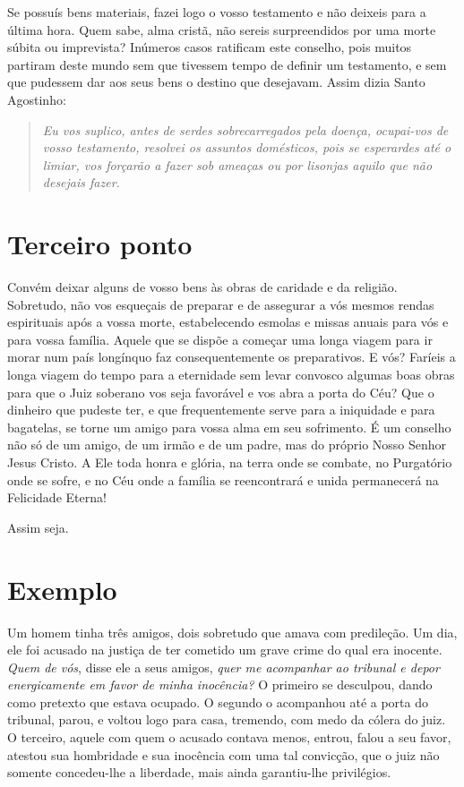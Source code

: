 Se possuís bens materiais, fazei logo o vosso testamento e não deixeis para a última hora. Quem sabe, alma cristã, não sereis surpreendidos por uma morte súbita ou imprevista? Inúmeros casos ratificam este conselho, pois muitos partiram deste mundo sem que tivessem tempo de definir um testamento, e sem que pudessem dar aos seus bens o destino que desejavam. Assim dizia Santo Agostinho:

\begin{quote}
\textit{\textit{Eu vos suplico, antes de serdes sobrecarregados pela doença, ocupai-vos de vosso testamento, resolvei os assuntos domésticos, pois se esperardes até o limiar, vos forçarão a fazer sob ameaças ou por lisonjas aquilo que não desejais fazer.}}
\end{quote}

\section*{Terceiro ponto}

Convém deixar alguns de vosso bens às obras de caridade e da religião. Sobretudo, não vos esqueçais de preparar e de assegurar a vós mesmos rendas espirituais após a vossa morte, estabelecendo esmolas e missas anuais para vós e para vossa família. Aquele que se dispõe a começar uma longa viagem para ir morar num país longínquo faz consequentemente os preparativos. E vós? Faríeis a longa viagem do tempo para a eternidade sem levar convosco algumas boas obras para que o Juiz soberano vos seja favorável e vos abra a porta do Céu? Que o dinheiro que pudeste ter, e que frequentemente serve para a iniquidade e para bagatelas, se torne um amigo para vossa alma em seu sofrimento. É um conselho não só de um amigo, de um irmão e de um padre, mas do próprio Nosso Senhor Jesus Cristo. A Ele toda honra e glória, na terra onde se combate, no Purgatório onde se sofre, e no Céu onde a família se reencontrará e unida permanecerá na Felicidade Eterna!

Assim seja.

\section*{Exemplo }

Um homem tinha três amigos, dois sobretudo que amava com predileção. Um dia, ele foi acusado na justiça de ter cometido um grave crime do qual era inocente. \textit{Quem de vós}, disse ele a seus amigos, \textit{quer me acompanhar ao tribunal e depor energicamente em favor de minha inocência?} O primeiro se desculpou, dando como pretexto que estava ocupado. O segundo o acompanhou até a porta do tribunal, parou, e voltou logo para casa, tremendo, com medo da cólera do juiz. O terceiro, aquele com quem o acusado contava menos, entrou, falou a seu favor, atestou sua hombridade e sua inocência com uma tal convicção, que o juiz não somente concedeu-lhe a liberdade, mais ainda garantiu-lhe privilégios. 

